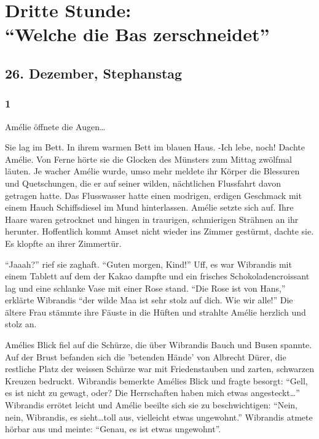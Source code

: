 \documentclass[11pt,titlepage,a5paper]{book}
\begin{document}
\part*{Dritte Stunde:\\"`Welche die Bas zerschneidet"'}

\chapter*{26. Dezember, Stephanstag}

\section*{1}

Amélie öffnete die Augen\dots

Sie lag im Bett. In ihrem warmen Bett im blauen Haus. -Ich lebe, noch! Dachte Amélie. Von Ferne hörte sie die Glocken des Münsters zum Mittag zwölfmal läuten. Je wacher Amélie wurde, umso mehr meldete ihr Körper die Blessuren und Quetschungen, die er auf seiner wilden, nächtlichen Flussfahrt davon getragen hatte. Das Flusswasser hatte einen modrigen, erdigen Geschmack mit einem Hauch Schiffsdiesel im Mund hinterlassen. Amélie setzte sich auf. Ihre Haare waren getrocknet und hingen in traurigen, schmierigen Strähnen an ihr herunter. Hoffentlich kommt Amset nicht wieder ins Zimmer gestürmt, dachte sie. Es klopfte an ihrer Zimmertür.

"`Jaaah?"' rief sie zaghaft. "`Guten morgen, Kind!"' Uff, es war Wibrandis mit einem Tablett auf dem der Kakao dampfte und ein frisches Schokoladencroissant lag und eine schlanke Vase mit einer Rose stand. "`Die Rose ist von Hans,"' erklärte Wibrandis "`der wilde Maa ist sehr stolz auf dich. Wie wir alle!"' Die ältere Frau stämmte ihre Fäuste in die Hüften und strahlte Amélie herzlich und stolz an.

Amélies Blick fiel auf die Schürze, die über Wibrandis Bauch und Busen spannte. Auf der Brust befanden sich die 'betenden Hände' von Albrecht Dürer, die restliche Platz der weissen Schürze war mit Friedenstauben und zarten, schwarzen Kreuzen bedruckt. Wibrandis bemerkte Amélies Blick und fragte besorgt: "`Gell, es ist nicht zu gewagt, oder? Die Herrschaften haben mich etwas angesteckt\dots"' Wibrandis errötet leicht und Amélie beeilte sich sie zu beschwichtigen: "`Nein, nein, Wibrandis, es sieht\dots toll aus, vielleicht etwas ungewohnt."' Wibrandis atmete hörbar aus und meinte: "`Genau, es ist etwas ungewohnt"'.
\end{document}
